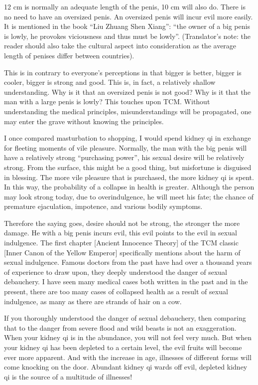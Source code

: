 \documentclass[
]{book}
\begin{document}
12 cm is normally an adequate length of the penis, 10 cm will also do. There is no need to have an oversized penis. An oversized penis will incur evil more easily. It is mentioned in the book ``Liu Zhuang Shen Xiang'': ``the owner of a big penis is lowly, he provokes viciousness and thus must be lowly''. (Translator's note: the reader should also take the cultural aspect into consideration as the average length of penises differ between countries).

This is in contrary to everyone's perceptions in that bigger is better, bigger is cooler, bigger is strong and good. This is, in fact, a relatively shallow understanding. Why is it that an oversized penis is not good? Why is it that the man with a large penis is lowly? This touches upon TCM. Without understanding the medical principles, misunderstandings will be propagated, one may enter the grave without knowing the principles.

I once compared masturbation to shopping, I would spend kidney qi in exchange for fleeting moments of vile pleasure. Normally, the man with the big penis will have a relatively strong ``purchasing power'', his sexual desire will be relatively strong. From the surface, this might be a good thing, but misfortune is disguised in blessing. The more vile pleasure that is purchased, the more kidney qi is spent. In this way, the probability of a collapse in health is greater. Although the person may look strong today, due to overindulgence, he will meet his fate; the chance of premature ejaculation, impotence, and various bodily symptoms.

Therefore the saying goes, desire should not be strong, the stronger the more damage. He with a big penis incurs evil, this evil points to the evil in sexual indulgence. The first chapter {[}Ancient Innocence Theory{]} of the TCM classic {[}Inner Canon of the Yellow Emperor{]} specifically mentions about the harm of sexual indulgence. Famous doctors from the past have had over a thousand years of experience to draw upon, they deeply understood the danger of sexual debauchery. I have seen many medical cases both written in the past and in the present, there are too many cases of collapsed health as a result of sexual indulgence, as many as there are strands of hair on a cow.

If you thoroughly understood the danger of sexual debauchery, then comparing that to the danger from severe flood and wild beasts is not an exaggeration. When your kidney qi is in the abundance, you will not feel very much. But when your kidney qi has been depleted to a certain level, the evil fruits will become ever more apparent. And with the increase in age, illnesses of different forms will come knocking on the door. Abundant kidney qi wards off evil, depleted kidney qi is the source of a multitude of illnesses!
\end{document}
